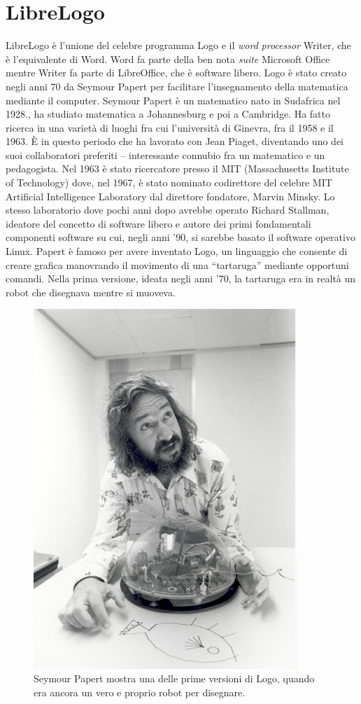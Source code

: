 \chapter{LibreLogo} \label{cap:librelogo}

LibreLogo è l'unione del celebre programma Logo e il \textit{word} \textit{processor} Writer, che è l'equivalente di Word. Word fa parte della ben nota \textit{suite} Microsoft Office mentre Writer fa parte di LibreOffice, che è software libero. Logo è stato creato negli anni 70 da Seymour Papert per facilitare l'insegnamento della matematica mediante il computer. Seymour Papert è un matematico nato in Sudafrica nel 1928., ha studiato matematica a Johannesburg e poi a Cambridge. Ha fatto ricerca in una varietà di luoghi fra cui l'università di Ginevra, fra il 1958 e il 1963. È in questo periodo che ha lavorato con Jean Piaget, diventando uno dei suoi collaboratori preferiti – interessante connubio fra un matematico e un pedagogista. Nel 1963 è stato ricercatore presso il MIT (Massachusetts Institute of Technology) dove, nel 1967, è stato nominato codirettore del celebre MIT Artificial Intelligence Laboratory dal direttore fondatore, Marvin Minsky. Lo stesso laboratorio dove pochi anni dopo avrebbe operato Richard Stallman, ideatore del concetto di software libero e autore dei primi fondamentali componenti software su cui, negli anni '90, si sarebbe basato il software operativo Linux.  Papert è famoso per avere inventato Logo, un linguaggio che consente di creare grafica manovrando il movimento di una “tartaruga” mediante opportuni comandi. Nella prima versione, ideata negli anni '70, la tartaruga era in realtà un robot che disegnava mentre si muoveva.
\begin{figure}
   \includegraphics[width=10.0cm]{./images/librelogo/Papert-x640.jpg}
   \caption{Seymour Papert mostra una delle prime versioni di Logo, quando era ancora un vero e proprio robot per disegnare.} 
\label{papert}
\end{figure}
